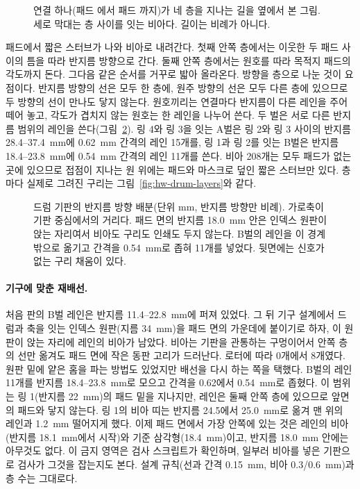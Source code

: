 \begin{figure}[ht]
\centering

\caption{연결 하나(패드 에서 패드 까지)가 네 층을 지나는 길을 옆에서 본 그림. 세로 막대는
층 사이를 잇는 비아다. 길이는 비례가 아니다.}
\label{fig:hw-drum-route}
\end{figure}

패드에서 짧은 스터브가 나와 비아로 내려간다. 첫째 안쪽 층에서는 이웃한 두 패드 사이의 틈을 따라 반지름
방향으로 간다. 둘째 안쪽 층에서는 원호를 따라 목적지 패드의 각도까지 돈다. 그다음 같은 순서를 거꾸로 밟아
올라온다. 방향을 층으로 나눈 것이 요점이다. 반지름 방향의 선은 모두 한 층에, 원주 방향의 선은 모두 다른 층에
있으므로 두 방향의 선이 만나도 닿지 않는다. 원호끼리는 연결마다 반지름이 다른 레인을 주어 떼어 놓고, 각도가
겹치지 않는 원호는 한 레인을 나누어 쓴다. 두 벌은 서로 다른 반지름 범위의 레인을 쓴다(그림~\ref{fig:hw-drum-radii}).
링 4와 링 3을 잇는 A벌은 링 2와 링 3 사이의 반지름 28.4--37.4~mm에 0.62~mm 간격의 레인 15개를, 링 1과 링 2를 잇는
B벌은 반지름 18.4--23.8~mm에 0.54~mm 간격의 레인 11개를 쓴다. 비아 208개는 모두 패드가 없는 곳에 있으므로 접점이
지나는 원 위에는 패드와 마스크로 덮인 짧은 스터브만 있다. 층마다 실제로 그려진 구리는
그림~\ref{fig:hw-drum-layers}와 같다.

\begin{figure}[ht]
\centering

\caption{드럼 기판의 반지름 방향 배분(단위 mm, 반지름 방향만 비례). 가로축이 기판 중심에서의 거리다. 패드 면의
반지름 18.0~mm 안은 인덱스 원판이 앉는 자리여서 비아도 구리도 인쇄도 두지 않는다. B벌의 레인을 이 경계 밖으로 옮기고
간격을 0.54~mm로 좁혀 11개를 넣었다. 뒷면에는 신호가 없는 구리 채움이 있다.}
\label{fig:hw-drum-radii}
\end{figure}

\paragraph{기구에 맞춘 재배선.} 처음 판의 B벌 레인은 반지름 11.4--22.8~mm에 퍼져 있었다. 그 뒤 기구 설계에서 드럼과
축을 잇는 인덱스 원판(지름 34~mm)을 패드 면의 가운데에 붙이기로 하자, 이 원판이 앉는 자리에 레인의 비아가 남았다.
비아는 기판을 관통하는 구멍이어서 안쪽 층의 선만 옮겨도 패드 면에 작은 동판 고리가 드러난다. 로터에 따라 0개에서
8개였다. 원판 밑에 얕은 홈을 파는 방법도 있었지만 배선을 다시 하는 쪽을 택했다. B벌의 레인 11개를 반지름
18.4--23.8~mm로 모으고 간격을 0.62에서 0.54~mm로 좁혔다. 이 범위는 링 1(반지름 22~mm)의 패드 밑을 지나지만, 레인은
둘째 안쪽 층에 있으므로 앞면의 패드와 닿지 않는다. 링 1의 비아 띠는 반지름 24.5에서 25.0~mm로 옮겨 맨 위의
레인과 1.2~mm 떨어지게 했다. 이제 패드 면에서 가장 안쪽에 있는 것은 레인의 비아(반지름 18.1~mm에서 시작)와 기준
삼각형(18.4~mm)이고, 반지름 18.0~mm 안에는 아무것도 없다. 이 금지 영역은 검사 스크립트가 확인하며, 일부러 비아를
넣은 기판으로 검사가 그것을 잡는지도 본다. 설계 규칙(선과 간격 0.15~mm, 비아 0.3/0.6~mm)과 층 수는 그대로다.

